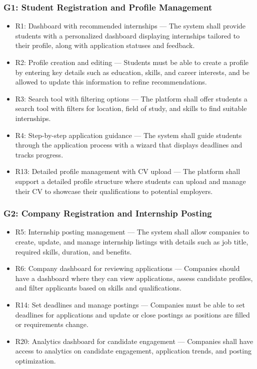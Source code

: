 \subsubsection{G1: Student Registration and Profile Management}
\begin{itemize}
    \item R1: Dashboard with recommended internships — The system shall provide students with a personalized dashboard displaying internships tailored to their profile, along with application statuses and feedback.
    \item R2: Profile creation and editing — Students must be able to create a profile by entering key details such as education, skills, and career interests, and be allowed to update this information to refine recommendations.
    \item R3: Search tool with filtering options — The platform shall offer students a search tool with filters for location, field of study, and skills to find suitable internships.
    \item R4: Step-by-step application guidance — The system shall guide students through the application process with a wizard that displays deadlines and tracks progress.
    \item R13: Detailed profile management with CV upload — The platform shall support a detailed profile structure where students can upload and manage their CV to showcase their qualifications to potential employers.
\end{itemize}

\subsubsection{G2: Company Registration and Internship Posting}
\begin{itemize}
    \item R5: Internship posting management — The system shall allow companies to create, update, and manage internship listings with details such as job title, required skills, duration, and benefits.
    \item R6: Company dashboard for reviewing applications — Companies should have a dashboard where they can view applications, assess candidate profiles, and filter applicants based on skills and qualifications.
    \item R14: Set deadlines and manage postings — Companies must be able to set deadlines for applications and update or close postings as positions are filled or requirements change.
    \item R20: Analytics dashboard for candidate engagement — Companies shall have access to analytics on candidate engagement, application trends, and posting optimization.
\end{itemize}

